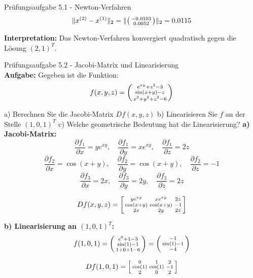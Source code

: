 \begin{example2}{Prüfungsaufgabe 5.1 - Newton-Verfahren}
$$\|x^{(2)} - x^{(1)}\|_2 = \|\begin{psmallmatrix} -0.0103 \\ 0.0052 \end{psmallmatrix}\|_2 = 0.0115$$

\textbf{Interpretation:} Das Newton-Verfahren konvergiert quadratisch gegen die Lösung $(2, 1)^T$.
\end{example2}

\begin{example2}{Prüfungsaufgabe 5.2 - Jacobi-Matrix und Linearisierung}\\
\textbf{Aufgabe:} Gegeben ist die Funktion:
$$f(x, y, z) = \begin{psmallmatrix} e^{xy} + z^2 - 3 \\ \sin(x + y) - z \\ x^2 + y^2 + z^2 - 6 \end{psmallmatrix}$$

a) Berechnen Sie die Jacobi-Matrix $Df(x, y, z)$
b) Linearisieren Sie $f$ an der Stelle $(1, 0, 1)^T$
c) Welche geometrische Bedeutung hat die Linearisierung?
\tcblower
\textbf{a) Jacobi-Matrix:}
$$\frac{\partial f_1}{\partial x} = ye^{xy}, \quad \frac{\partial f_1}{\partial y} = xe^{xy}, \quad \frac{\partial f_1}{\partial z} = 2z$$
$$\frac{\partial f_2}{\partial x} = \cos(x + y), \quad \frac{\partial f_2}{\partial y} = \cos(x + y), \quad \frac{\partial f_2}{\partial z} = -1$$
$$\frac{\partial f_3}{\partial x} = 2x, \quad \frac{\partial f_3}{\partial y} = 2y, \quad \frac{\partial f_3}{\partial z} = 2z$$

$$Df(x, y, z) = \begin{bsmallmatrix} ye^{xy} & xe^{xy} & 2z \\ \cos(x + y) & \cos(x + y) & -1 \\ 2x & 2y & 2z \end{bsmallmatrix}$$

\textbf{b) Linearisierung an $(1, 0, 1)^T$:}
$$f(1, 0, 1) = \begin{psmallmatrix} e^0 + 1 - 3 \\ \sin(1) - 1 \\ 1 + 0 + 1 - 6 \end{psmallmatrix} = \begin{psmallmatrix} -1 \\ \sin(1) - 1 \\ -4 \end{psmallmatrix}$$

$$Df(1, 0, 1) = \begin{bsmallmatrix} 0 & 1 & 2 \\ \cos(1) & \cos(1) & -1 \\ 2 & 0 & 2 \end{bsmallmatrix}$$


\end{example2}
